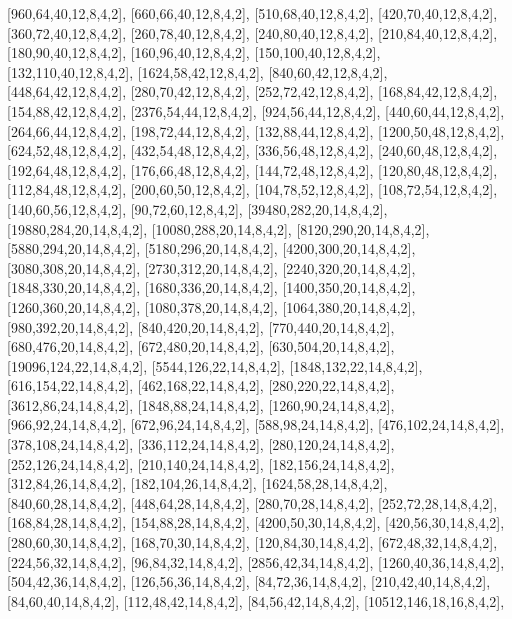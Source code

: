 \documentclass[12pt]{amsart}
\begin{document}
[960,64,40,12,8,4,2],   [660,66,40,12,8,4,2],   [510,68,40,12,8,4,2],   [420,70,40,12,8,4,2],   [360,72,40,12,8,4,2],   [260,78,40,12,8,4,2],   [240,80,40,12,8,4,2],
[210,84,40,12,8,4,2],   [180,90,40,12,8,4,2],   [160,96,40,12,8,4,2],   [150,100,40,12,8,4,2],   [132,110,40,12,8,4,2],   [1624,58,42,12,8,4,2],   [840,60,42,12,8,4,2],
[448,64,42,12,8,4,2],   [280,70,42,12,8,4,2],   [252,72,42,12,8,4,2],   [168,84,42,12,8,4,2],   [154,88,42,12,8,4,2],   [2376,54,44,12,8,4,2],   [924,56,44,12,8,4,2],
[440,60,44,12,8,4,2],   [264,66,44,12,8,4,2],   [198,72,44,12,8,4,2],   [132,88,44,12,8,4,2],   [1200,50,48,12,8,4,2],   [624,52,48,12,8,4,2],   [432,54,48,12,8,4,2],
[336,56,48,12,8,4,2],   [240,60,48,12,8,4,2],   [192,64,48,12,8,4,2],   [176,66,48,12,8,4,2],   [144,72,48,12,8,4,2],   [120,80,48,12,8,4,2],   [112,84,48,12,8,4,2],
[200,60,50,12,8,4,2],   [104,78,52,12,8,4,2],   [108,72,54,12,8,4,2],   [140,60,56,12,8,4,2],   [90,72,60,12,8,4,2],   [39480,282,20,14,8,4,2],   [19880,284,20,14,8,4,2],
[10080,288,20,14,8,4,2],   [8120,290,20,14,8,4,2],   [5880,294,20,14,8,4,2],   [5180,296,20,14,8,4,2],   [4200,300,20,14,8,4,2],   [3080,308,20,14,8,4,2],
[2730,312,20,14,8,4,2],   [2240,320,20,14,8,4,2],   [1848,330,20,14,8,4,2],   [1680,336,20,14,8,4,2],   [1400,350,20,14,8,4,2],   [1260,360,20,14,8,4,2],
[1080,378,20,14,8,4,2],   [1064,380,20,14,8,4,2],   [980,392,20,14,8,4,2],   [840,420,20,14,8,4,2],   [770,440,20,14,8,4,2],   [680,476,20,14,8,4,2],
[672,480,20,14,8,4,2],   [630,504,20,14,8,4,2],   [19096,124,22,14,8,4,2],   [5544,126,22,14,8,4,2],   [1848,132,22,14,8,4,2],   [616,154,22,14,8,4,2],
[462,168,22,14,8,4,2],   [280,220,22,14,8,4,2],   [3612,86,24,14,8,4,2],   [1848,88,24,14,8,4,2],   [1260,90,24,14,8,4,2],   [966,92,24,14,8,4,2],   [672,96,24,14,8,4,2],
[588,98,24,14,8,4,2],   [476,102,24,14,8,4,2],   [378,108,24,14,8,4,2],   [336,112,24,14,8,4,2],   [280,120,24,14,8,4,2],   [252,126,24,14,8,4,2],   [210,140,24,14,8,4,2],
[182,156,24,14,8,4,2],   [312,84,26,14,8,4,2],   [182,104,26,14,8,4,2],   [1624,58,28,14,8,4,2],   [840,60,28,14,8,4,2],   [448,64,28,14,8,4,2],   [280,70,28,14,8,4,2],
[252,72,28,14,8,4,2],   [168,84,28,14,8,4,2],   [154,88,28,14,8,4,2],   [4200,50,30,14,8,4,2],   [420,56,30,14,8,4,2],   [280,60,30,14,8,4,2],   [168,70,30,14,8,4,2],
[120,84,30,14,8,4,2],   [672,48,32,14,8,4,2],   [224,56,32,14,8,4,2],   [96,84,32,14,8,4,2],   [2856,42,34,14,8,4,2],   [1260,40,36,14,8,4,2],   [504,42,36,14,8,4,2],
[126,56,36,14,8,4,2],   [84,72,36,14,8,4,2],   [210,42,40,14,8,4,2],   [84,60,40,14,8,4,2],   [112,48,42,14,8,4,2],   [84,56,42,14,8,4,2],   [10512,146,18,16,8,4,2],
\end{document}
